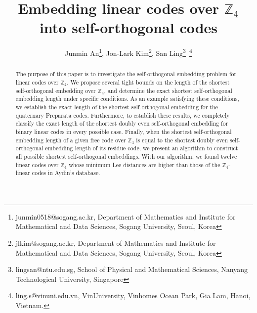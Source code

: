 \documentclass{article}
\title{Embedding linear codes over $\mathbb{Z}_4$ into self-orthogonal codes}
\author{Junmin An\thanks{junmin0518@sogang.ac.kr, Department of Mathematics and Institute for Mathematical and Data Sciences, Sogang University, Seoul, Korea}, Jon-Lark Kim\thanks{jlkim@sogang.ac.kr, Department of Mathematics and Institute for Mathematical and Data Sciences, Sogang University, Seoul, Korea}, San Ling\thanks{lingsan@ntu.edu.sg, School of Physical and Mathematical Sciences, Nanyang Technological University, Singapore}~\thanks{ling.s@vinuni.edu.vn, VinUniversity, Vinhomes Ocean Park, Gia Lam, Hanoi, Vietnam.}}
\date{}
\theoremstyle{definition}
\theoremstyle{remark}
\begin{document}
\maketitle
\begin{abstract}
The purpose of this paper is to investigate the self-orthogonal embedding problem for linear codes over $\mathbb{Z}_4$. We propose several tight bounds on the length of the shortest self-orthogonal embedding over $\mathbb{Z}_4$, and determine the exact shortest self-orthogonal embedding length under specific conditions. As an example satisfying these conditions, we establish the exact length of the shortest self-orthogonal embedding for the quaternary Preparata codes. Furthermore, to establish these results, we completely classify the exact length of the shortest doubly even self-orthogonal embedding for binary linear codes in every possible case. Finally, when the shortest self-orthogonal embedding length of a given free code over $\mathbb{Z}_4$ is equal to the shortest doubly even self-orthogonal embedding length of its residue code, we present an algorithm to construct all possible shortest self-orthogonal embeddings. With our algorithm, we found twelve linear codes over $\mathbb{Z}_4$ whose minimum Lee distances are higher than those of the $\mathbb{Z}_4$-linear codes in Aydin’s database.
\end{abstract}
\end{document}
